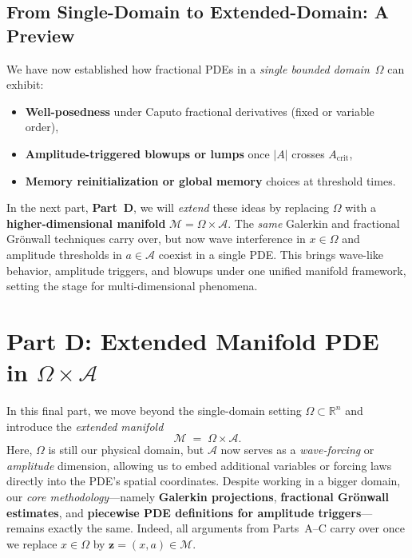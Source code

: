 \documentclass[12pt]{article}
\begin{document}
\subsection*{From Single-Domain to Extended-Domain: A Preview}
\label{subsec:bridge_single_to_extended}

We have now established how fractional PDEs in a \textit{single bounded domain}~\(\Omega\) 
can exhibit:
\begin{itemize}
    \item \textbf{Well-posedness} under Caputo fractional derivatives (fixed or variable order),
    \item \textbf{Amplitude-triggered blowups or lumps} once \( |A|\) crosses \(A_{\mathrm{crit}}\),
    \item \textbf{Memory reinitialization or global memory} choices at threshold times.
\end{itemize}
In the next part, \textbf{Part~D}, we will \emph{extend} these ideas by replacing \(\Omega\) 
with a \textbf{higher-dimensional manifold} \( \mathcal{M} = \Omega \times \mathcal{A}\).  
The \emph{same} Galerkin and fractional Grönwall techniques carry over, but now wave 
interference in \(x\in\Omega\) and amplitude thresholds in \(a\in\mathcal{A}\) coexist 
in a single PDE.  This brings wave-like behavior, amplitude triggers, and blowups under 
one unified manifold framework, setting the stage for multi-dimensional phenomena.


\section{Part D: Extended Manifold PDE in \texorpdfstring{\(\Omega\times\mathcal{A}\)}{}}
\label{sec:intro}
\label{sec:intro_partD}

In this final part, we move beyond the single-domain setting \(\Omega\subset\mathbb{R}^n\) 
and introduce the \emph{extended manifold}
\[
   \mathcal{M} \;=\; \Omega \times \mathcal{A}.
\]
Here, \(\Omega\) is still our physical domain, but \(\mathcal{A}\) now serves as a 
\emph{wave-forcing} or \emph{amplitude} dimension, allowing us to embed additional 
variables or forcing laws directly into the PDE’s spatial coordinates. 
Despite working in a bigger domain, our \emph{core methodology}---namely \textbf{Galerkin 
projections}, \textbf{fractional Grönwall estimates}, and \textbf{piecewise PDE definitions 
for amplitude triggers}---remains exactly the same.  Indeed, all arguments from Parts~A--C 
carry over once we replace \(x\in\Omega\) by \(\mathbf{z}=(x,a)\in \mathcal{M}\).
\end{document}
